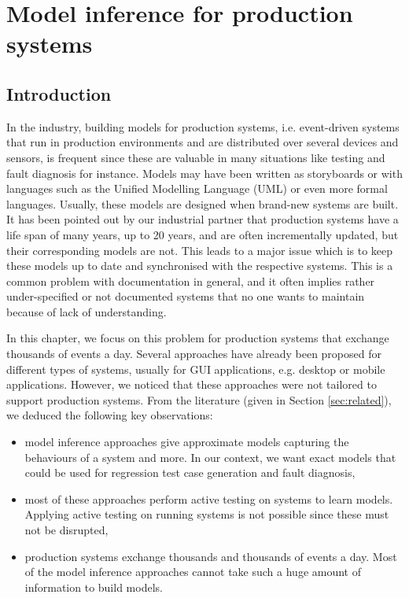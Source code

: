 %
\chapter{Model inference for production systems}
\label{sec:modelinf:prodsystems}

\section{Introduction}

In the industry, building models for production systems, i.e.
event-driven systems that run in production environments and are
distributed over several devices and sensors, is frequent since
these are valuable in many situations like testing and fault
diagnosis for instance. Models may have been written as
storyboards or with languages such as the Unified Modelling
Language (UML) or even more formal languages. Usually, these
models are designed when brand-new systems are built. It has been
pointed out by our industrial partner that production systems
have a life span of many years, up to 20 years, and are often
incrementally updated, but their corresponding models are not.
This leads to a major issue which is to keep these models up to
date and synchronised with the respective systems. This is a
common problem with documentation in general, and it often
implies rather under-specified or not documented systems that no
one wants to maintain because of lack of understanding.

In this chapter, we focus on this problem for production systems
that exchange thousands of events a day. Several approaches have
already been proposed for different types of systems, usually for
GUI applications, e.g. desktop or mobile applications. However,
we noticed that these approaches were not tailored to support
production systems. From the literature (given in Section
\ref{sec:related}), we deduced the following key observations:

\begin{itemize}
    \item model inference approaches give approximate models
    capturing the behaviours of a system and more. In our
    context, we want exact models that could be used for
    regression test case generation and fault diagnosis,

    \item most of these approaches perform active testing on
    systems to learn models. Applying active testing on running
    systems is not possible since these must not be disrupted,

    \item production systems exchange thousands and thousands of
    events a day. Most of the model inference approaches cannot
    take such a huge amount of information to build models.
\end{itemize}

